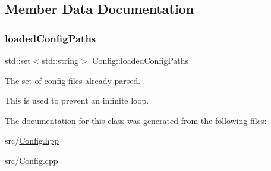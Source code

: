 \subsection{Member Data Documentation}
\mbox{\label{classConfig_a02be73634e4b7debd0551a360dac9503}} 
\subsubsection{\texorpdfstring{loaded\+Config\+Paths}{loadedConfigPaths}}
{\footnotesize\ttfamily std\+::set$<$std\+::string$>$ Config\+::loaded\+Config\+Paths\hspace{0.3cm}{\ttfamily [private]}}



The set of config files already parsed. 

This is used to prevent an infinite loop. 

The documentation for this class was generated from the following files\+:\begin{DoxyCompactItemize}
\item 
src/\hyperlink{Config_8hpp}{Config.\+hpp}\item 
src/Config.\+cpp\end{DoxyCompactItemize}
